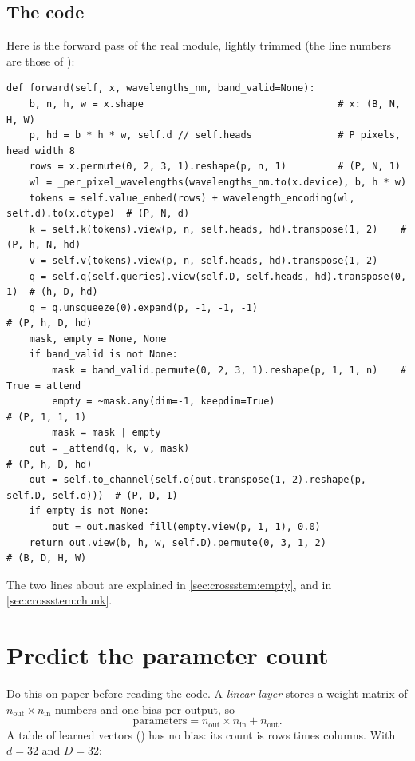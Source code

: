 \subsection{The code}

Here is the forward pass of the real module, lightly trimmed (the line numbers are those of ):

\begin{lstlisting}
def forward(self, x, wavelengths_nm, band_valid=None):
    b, n, h, w = x.shape                                  # x: (B, N, H, W)
    p, hd = b * h * w, self.d // self.heads               # P pixels, head width 8
    rows = x.permute(0, 2, 3, 1).reshape(p, n, 1)         # (P, N, 1)
    wl = _per_pixel_wavelengths(wavelengths_nm.to(x.device), b, h * w)
    tokens = self.value_embed(rows) + wavelength_encoding(wl, self.d).to(x.dtype)  # (P, N, d)
    k = self.k(tokens).view(p, n, self.heads, hd).transpose(1, 2)    # (P, h, N, hd)
    v = self.v(tokens).view(p, n, self.heads, hd).transpose(1, 2)
    q = self.q(self.queries).view(self.D, self.heads, hd).transpose(0, 1)  # (h, D, hd)
    q = q.unsqueeze(0).expand(p, -1, -1, -1)                          # (P, h, D, hd)
    mask, empty = None, None
    if band_valid is not None:
        mask = band_valid.permute(0, 2, 3, 1).reshape(p, 1, 1, n)    # True = attend
        empty = ~mask.any(dim=-1, keepdim=True)                       # (P, 1, 1, 1)
        mask = mask | empty
    out = _attend(q, k, v, mask)                                      # (P, h, D, hd)
    out = self.to_channel(self.o(out.transpose(1, 2).reshape(p, self.D, self.d)))  # (P, D, 1)
    if empty is not None:
        out = out.masked_fill(empty.view(p, 1, 1), 0.0)
    return out.view(b, h, w, self.D).permute(0, 3, 1, 2)              # (B, D, H, W)
\end{lstlisting}

The two lines about  are explained in \cref{sec:crossstem:empty}, and  in \cref{sec:crossstem:chunk}.

\section{Predict the parameter count}\label{sec:crossstem:params}

Do this on paper before reading the code. A \emph{linear layer}  stores a weight matrix of $n_{\text{out}}\times n_{\text{in}}$ numbers and one bias per output, so
\begin{equation}\label{eq:crossstem:linear}
  \text{parameters} = n_{\text{out}}\times n_{\text{in}} + n_{\text{out}} .
\end{equation}
A table of learned vectors () has no bias: its count is rows times columns. With $d = 32$ and $D = 32$:

